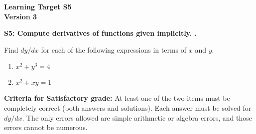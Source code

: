 \documentclass[10pt]{article}
\begin{document}
	\vspace*{0in}

		\begin{center}
			\textbf{Learning Target S5 \\
			Version 3} 
		\end{center}


\begin{framed}
	\textbf{S5: Compute derivatives of functions given implicitly.
.}
\end{framed}

Find $dy/dx$ for each of the following expressions in terms of $x$ and $y$. 

\begin{enumerate}
    \item $x^2 + y^3= 4$
    \item $x^2 + xy  = 1$
\end{enumerate}

\vfill


\begin{small}
    \begin{framed}
        	\textbf{Criteria for Satisfactory grade:} At least one of the two items must be completely correct (both answers and solutions). Each answer must be solved for $dy/dx$. The only errors allowed are simple arithmetic or algebra errors, and those errors cannot be numerous.
    \end{framed}

\end{small}
\end{document}
